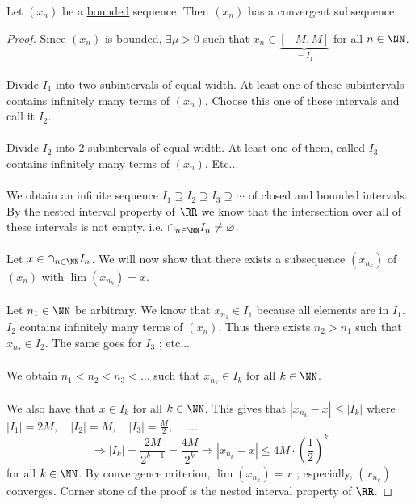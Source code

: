 \documentclass[class=scrartcl, crop=false]{standalone}
\begin{document}
\begin{theorem}
  Let $(x_n)$ be a \ul{bounded} sequence. Then $(x_n)$ has a convergent subsequence. 
  \begin{proof}
    Since $(x_n)$ is bounded, $\exists \mu > 0$ such that $x_n \in \underbrace{[-M, M]}_{= I_1}$ for all $n \in \NN$.
    \\\\
    Divide $I_1$ into two subintervals of equal width. At least one of these subintervals contains infinitely many terms of $(x_n)$. Choose this one of these intervals and call it $I_2$.
    \\\\
    Divide $I_2$ into 2 subintervals of equal width. At least one of them, called $I_3$ contains infinitely many terms of $(x_n)$. Etc...
    \\\\
    We obtain an infinite sequence $I_1 \supseteq I_2 \supseteq I_3 \supseteq \cdots$ of closed and bounded intervals. By the nested interval property of $\RR$ we know that the intersection over all of these intervals is not empty. i.e. $\cap_{n \in \NN} I_n \neq \varnothing$.
    \\\\
    Let $x \in \cap_{n \in \NN} I_n$. We will now show that there exists a subsequence $(x_{n_k})$ of $(x_n)$ with $\lim(x_{n_k}) = x$.
    \\\\
    Let $n_1 \in \NN$ be arbitrary. We know that $x_{n_1} \in I_1$ because all elements are in $I_1$. $I_2$ contains infinitely many terms of $(x_n)$. Thus there exists $n_2 > n_1$ such that $x_{n_2} \in I_2$. The same goes for $I_3$ ; etc...
    \\\\
    We obtain $n_1 < n_2 < n_3 < \dots$ such that $x_{n_k} \in I_k$ for all $k \in\NN$.
    \\\\
    We also have that $x \in I_k$ for all $k \in \NN$. This gives that $|x_{n_k} - x| \leq |I_k|$ where $|I_1| = 2M, \quad |I_2| = M, \quad |I_3| = \frac{M}{2}, \quad\dots$.
    \[
      \Rightarrow |I_k| = \frac{2M}{2^{k - 1}} = \frac{4M}{2^k} \Rightarrow |x_{n_k} - x| \leq 4M \cdot (\frac{1}{2})^k
    \]
    for all $k \in \NN$. By convergence criterion, $\lim(x_{n_k}) = x$ ; especially, $(x_{n_k})$ converges.
    Corner stone of the proof is the nested interval property of $\RR$.
  \end{proof}
\end{theorem}
\end{document}
